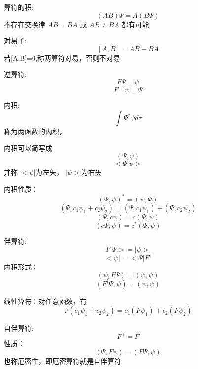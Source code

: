 \begin{frame}
    \begin{definition}
        算符的积: 
        $$ (AB)\Psi=A(B\Psi) $$
        不存在交换律
        $AB=BA$ 或 $AB\ne BA$ 都有可能
    \end{definition}
    \begin{definition}
        对易子: 
        $$ [A,B]=AB-BA$$
        若[A,B]=0,称两算符对易，否则不对易
    \end{definition}
\end{frame} 

\begin{frame}
    \begin{definition}
        逆算符: 
        $$ F\Psi=\psi $$
        $$ F^{-1}\psi=\Psi $$
    \end{definition}
    \begin{definition}
        内积: 
        $$ \int\Psi^*\psi d \tau$$
        称为两函数的内积，
    \end{definition} 
        内积可以简写成
        $$ (\Psi,\psi)$$ 
        $$ <\Psi|\psi>$$
        并称 $ <\psi|$为左矢， $|\psi>$为右矢\\
    \end{frame} 

    \begin{frame}        
        内积性质：
        $$ (\Psi,\psi)^*=(\psi,\Psi)$$ 
        $$ (\Psi,c_1\psi_1+c_2\psi_2)=(\Psi,c_1\psi_1)+(\Psi,c_2\psi_2)$$ 
        $$ (\Psi,c\psi)=c(\Psi,\psi)$$ 
        $$ (c\Psi,\psi)=c^*(\Psi,\psi)$$ 
  
    \begin{definition}
        伴算符: 
        $$ F|\Psi> = |\psi> $$
        $$ <\psi| = <\Psi|F^{\dagger} $$
        内积形式：
        $$ (\psi,F\Psi)=(\psi,\psi)$$ 
        $$ (F^\dagger \Psi,\psi)=(\psi,\psi)$$ 
    \end{definition}  
\end{frame} 

\begin{frame} 
        \begin{definition}
        线性算符：对任意函数，有\\
        $$F(c_1\psi_1+c_2\psi_2 ) = c_1(F\psi_1)+c_2(F\psi_2 )$$
    \end{definition}
    \begin{definition}
        自伴算符: 
        $$ F^{+} = F $$
        性质：
        $$ (\Psi,F\psi)=(F\Psi,\psi)$$ 
        也称厄密性，即厄密算符就是自伴算符
    \end{definition} 
\end{frame} 

